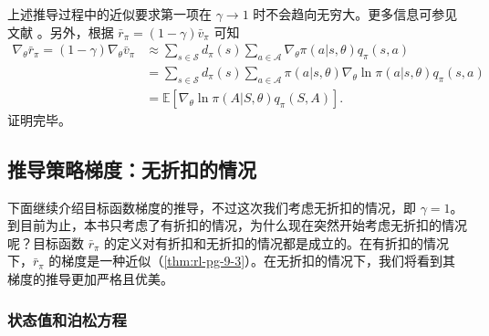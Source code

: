 \begin{note}
\begin{equation}
\end{equation}
上述推导过程中的近似要求第一项在 $\gamma \to 1$ 时不会趋向无穷大。更多信息可参见文献 。另外，根据 $\bar{r}_{\pi} = (1 - \gamma)\bar{v}_{\pi}$ 可知
\begin{equation}
\begin{aligned}
\nabla_{\theta} \bar{r}_{\pi} = (1 - \gamma) \nabla_{\theta} \bar{v}_{\pi} &\approx \sum_{s \in \mathcal{S}} d_{\pi}(s) \sum_{a \in \mathcal{A}} \nabla_{\theta} \pi(a|s,\theta) q_{\pi}(s,a) \\
&= \sum_{s \in \mathcal{S}} d_{\pi}(s) \sum_{a \in \mathcal{A}} \pi(a|s,\theta) \nabla_{\theta} \ln \pi(a|s,\theta) q_{\pi}(s,a) \\
&= \mathbb{E}\left[ \nabla_{\theta} \ln \pi(A|S,\theta) q_{\pi}(S,A) \right].
\end{aligned}
\end{equation}
证明完毕。
\end{note}

\subsection{推导策略梯度：无折扣的情况}
\label{sec:rl-pg-deriv-undisc}

下面继续介绍目标函数梯度的推导，不过这次我们考虑无折扣的情况，即 $\gamma = 1$。到目前为止，本书只考虑了有折扣的情况，为什么现在突然开始考虑无折扣的情况呢？目标函数 $\bar{r}_{\pi}$ 的定义对有折扣和无折扣的情况都是成立的。在有折扣的情况下，$\bar{r}_{\pi}$ 的梯度是一种近似（\cref{thm:rl-pg-9-3}）。在无折扣的情况下，我们将看到其梯度的推导更加严格且优美。

\subsubsection*{状态值和泊松方程}


